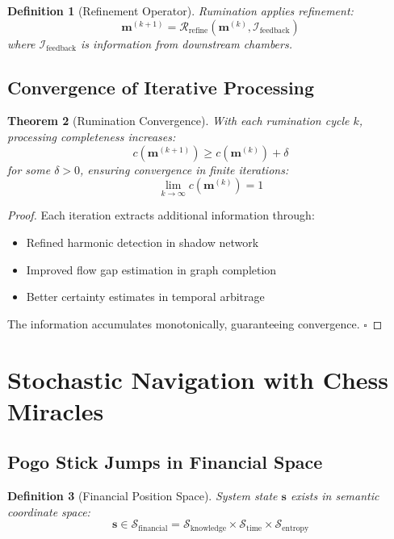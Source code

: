 \documentclass[12pt]{article}
\newtheorem{theorem}{Theorem}
\newtheorem{definition}[theorem]{Definition}
\begin{document}
\begin{definition}[Refinement Operator]
Rumination applies refinement:
$$
\mathbf{m}^{(k+1)} = \mathcal{R}_{\text{refine}}(\mathbf{m}^{(k)}, \mathcal{I}_{\text{feedback}})
$$
where $\mathcal{I}_{\text{feedback}}$ is information from downstream chambers.
\end{definition}

\subsection{Convergence of Iterative Processing}

\begin{theorem}[Rumination Convergence]
With each rumination cycle $k$, processing completeness increases:
$$
c(\mathbf{m}^{(k+1)}) \geq c(\mathbf{m}^{(k)}) + \delta
$$
for some $\delta > 0$, ensuring convergence in finite iterations:
$$
\lim_{k \to \infty} c(\mathbf{m}^{(k)}) = 1
$$
\end{theorem}

\begin{proof}
Each iteration extracts additional information through:
\begin{itemize}
    \item Refined harmonic detection in shadow network
    \item Improved flow gap estimation in graph completion
    \item Better certainty estimates in temporal arbitrage
\end{itemize}
The information accumulates monotonically, guaranteeing convergence.
$\square$
\end{proof}

\section{Stochastic Navigation with Chess Miracles}

\subsection{Pogo Stick Jumps in Financial Space}

\begin{definition}[Financial Position Space]
System state $\mathbf{s}$ exists in semantic coordinate space:
$$
\mathbf{s} \in \mathcal{S}_{\text{financial}} = \mathcal{S}_{\text{knowledge}} \times \mathcal{S}_{\text{time}} \times \mathcal{S}_{\text{entropy}}
$$
\end{definition}
\end{document}
